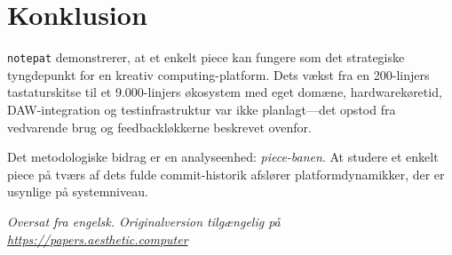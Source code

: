 \documentclass[10pt,letterpaper,twocolumn]{article}
\begin{document}
\section{Konklusion}

\texttt{notepat} demonstrerer, at et enkelt piece kan fungere som det strategiske tyngdepunkt for en kreativ computing-platform. Dets vækst fra en 200-linjers tastaturskitse til et 9.000-linjers økosystem med eget domæne, hardwarekøretid, DAW-integration og testinfrastruktur var ikke planlagt---det opstod fra vedvarende brug og feedbackløkkerne beskrevet ovenfor.

Det metodologiske bidrag er en analyseenhed: \emph{piece-banen}. At studere et enkelt piece på tværs af dets fulde commit-historik afslører platformdynamikker, der er usynlige på systemniveau.

\vspace{0.5em}\noindent\textit{Oversat fra engelsk. Originalversion tilgængelig på \url{https://papers.aesthetic.computer}}



\end{document}
